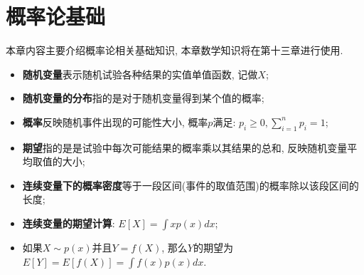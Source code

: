 \chapter{概率论基础}

本章内容主要介绍概率论相关基础知识, 本章数学知识将在第十三章进行使用. 

\begin{itemize}
	\item \textbf{随机变量}表示随机试验各种结果的实值单值函数, 记做$X$; 
	\item \textbf{随机变量的分布}指的是对于随机变量得到某个值的概率; 
	\item \textbf{概率}反映随机事件出现的可能性大小, 概率$p$满足: $p_i\ge 0,\sum_{i=1}^{n}p_i=1$; 
	\item \textbf{期望}指的是是试验中每次可能结果的概率乘以其结果的总和, 反映随机变量平均取值的大小; 
	\item \textbf{连续变量下的概率密度}等于一段区间(事件的取值范围)的概率除以该段区间的长度; 
	\item \textbf{连续变量的期望计算}: $E[X]=\int xp(x)dx$; 
	\item 如果$X\sim p(x)$并且$Y=f(X)$, 那么$Y$的期望为$E[Y]=E[f(X)]=\int f(x)p(x)dx$.
\end{itemize}

